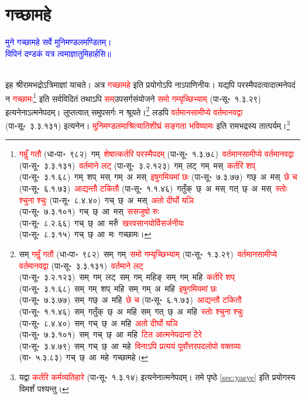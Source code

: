 \section[गच्छामहे]{गच्छामहे}
\centering\textcolor{blue}{मुने गच्छामहे सर्वे मुनिमण्डलमण्डितम्।\nopagebreak\\
विपिनं दण्डकं यत्र त्वमाज्ञातुमिहार्हसि॥}\nopagebreak\\
\\
\fontsize{14}{21}\selectfont\begin{sloppypar}\justifying\noindent\hspace{10mm} इह श्रीरामभद्रोऽत्रिमाज्ञां याचते। अत्र \textcolor{red}{गच्छामहे} इति प्रयोगोऽपि नाऽपाणिनीयः। यद्यपि परस्मैपदत्वादात्मनेपदं न \textcolor{red}{गच्छामः}\footnote{\textcolor{red}{गमॢँ गतौ} (धा॰पा॰~९८२)~\arrow गम्~\arrow \textcolor{red}{शेषात्कर्तरि परस्मैपदम्} (पा॰सू॰~१.३.७८)~\arrow \textcolor{red}{वर्तमान\-सामीप्ये वर्तमानवद्वा} (पा॰सू॰~३.३.१३१)~\arrow \textcolor{red}{वर्तमाने लट्} (पा॰सू॰~३.२.१२३)~\arrow गम्~लट्~\arrow गम्~मस्~\arrow \textcolor{red}{कर्तरि शप्‌} (पा॰सू॰~३.१.६८)~\arrow गम्~शप्~मस्~\arrow गम्~अ~मस्~\arrow \textcolor{red}{इषुगमियमां छः} (पा॰सू॰~७.३.७७)~\arrow गछ्~अ~मस्~\arrow \textcolor{red}{छे च} (पा॰सू॰~६.१.७३)~\arrow \textcolor{red}{आद्यन्तौ टकितौ} (पा॰सू॰~१.१.४६)~\arrow गतुँक्~छ्~अ~मस्~\arrow गत्~छ्~अ~मस्~\arrow \textcolor{red}{स्तोः श्चुना श्चुः} (पा॰सू॰~८.४.४०)~\arrow गच्~छ्~अ~मस्~\arrow \textcolor{red}{अतो दीर्घो यञि} (पा॰सू॰~७.३.१०१)~\arrow गच्~छ्~आ~मस्~\arrow \textcolor{red}{ससजुषो रुः} (पा॰सू॰~८.२.६६)~\arrow गच्~छ्~आ~मरुँ~\arrow \textcolor{red}{खरवसानयोर्विसर्जनीयः} (पा॰सू॰~८.३.१५)~\arrow गच्~छ्~आ~मः~\arrow गच्छामः।} इति सर्व\-विदितं तथाऽपि \textcolor{red}{सम्‌}\-उपसर्ग\-संयोजने \textcolor{red}{समो गम्यृच्छिभ्याम्} (पा॰सू॰~१.३.२९) इत्यनेनाऽत्मनेपदम्। लुप्तत्वात् समुपसर्गः न श्रूयते।\footnote{सम् \textcolor{red}{गमॢँ गतौ} (धा॰पा॰~९८२)~\arrow सम्~गम्~\arrow \textcolor{red}{समो गम्यृच्छिभ्याम्} (पा॰सू॰~१.३.२९)~\arrow \textcolor{red}{वर्तमान\-सामीप्ये वर्तमानवद्वा} (पा॰सू॰~३.३.१३१)~\arrow \textcolor{red}{वर्तमाने लट्} (पा॰सू॰~३.२.१२३)~\arrow सम्~गम्~लट्~\arrow सम्~गम्~महिङ्~\arrow सम्~गम्~महि~\arrow \textcolor{red}{कर्तरि शप्‌} (पा॰सू॰~३.१.६८)~\arrow सम्~गम्~शप्~महि~\arrow सम्~गम्~अ~महि~\arrow \textcolor{red}{इषुगमियमां छः} (पा॰सू॰~७.३.७७)~\arrow सम्~गछ्~अ~महि~\arrow \textcolor{red}{छे च} (पा॰सू॰~६.१.७३)~\arrow \textcolor{red}{आद्यन्तौ टकितौ} (पा॰सू॰~१.१.४६)~\arrow सम्~गतुँक्~छ्~अ~महि~\arrow सम्~गत्~छ्~अ~महि~\arrow \textcolor{red}{स्तोः श्चुना श्चुः} (पा॰सू॰~८.४.४०)~\arrow सम्~गच्~छ्~अ~महि~\arrow \textcolor{red}{अतो दीर्घो यञि} (पा॰सू॰~७.३.१०१)~\arrow सम्~गच्~छ्~आ~महि~\arrow \textcolor{red}{टित आत्मनेपदानां टेरे} (पा॰सू॰~३.४.७९)~\arrow सम्~गच्~छ्~आ~महे~\arrow \textcolor{red}{विनाऽपि प्रत्ययं पूर्वोत्तर\-पद\-लोपो वक्तव्यः} (वा॰~५.३.८३)~\arrow गच्~छ्~आ~महे~\arrow गच्छामहे।} लडपि \textcolor{red}{वर्तमान\-सामीप्ये वर्तमानवद्वा} (पा॰सू॰~३.३.१३१) इत्यनेन। \textcolor{red}{मुनि\-मण्डलमाश्रित्याति\-शीघ्रं सङ्गता भविष्यामः} इति रामभद्रस्य तात्पर्यम्।\footnote{यद्वा \textcolor{red}{कर्तरि कर्मव्यतिहारे} (पा॰सू॰~१.३.१४) इत्यनेनात्मने\-पदम्। \pageref{sec:yasye}तमे पृष्ठे \ref{sec:yasye}  इति प्रयोगस्य विमर्शं पश्यन्तु।}\end{sloppypar}
